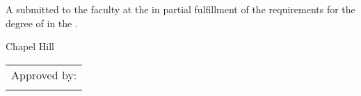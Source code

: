 
\begin{titlepage}

\begin{singlespace}
\centering


\vspace{1in}
\begin{adjustwidth}{0.5in}{0.5in}
\centering
\MakeUppercase{\uncthesistitle}
\end{adjustwidth}

\nointerlineskip\vspace{1in}

\uncthesisauthor{}

\nointerlineskip\vspace{1in}

\noindent
A \uncthesistype{} submitted to the faculty at the \uncthesisuniversity{} in partial fulfillment of the requirements for the degree of \uncdegreename{} in the \uncthesisdepartment{}.

\nointerlineskip\vspace{1in}

Chapel Hill\\
\uncthesisyear{}

\end{singlespace}


\nointerlineskip\vspace{0.71in}
\begin{flushright}
\begin{minipage}{2.1in}
\setlength{\tabcolsep}{0em}
\begin{tabular}{l}
Approved by: \\
\uncthesiscommittee{}
\end{tabular}
\end{minipage}
\end{flushright}

\end{titlepage}
